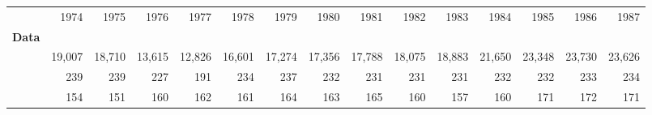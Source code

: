 \begin{tabular}{lllllllllllllll}
\cline{1-15}
\multicolumn{1}{c}{} &
  \multicolumn{1}{|r}{1974} &
  \multicolumn{1}{r}{1975} &
  \multicolumn{1}{r}{1976} &
  \multicolumn{1}{r}{1977} &
  \multicolumn{1}{r}{1978} &
  \multicolumn{1}{r}{1979} &
  \multicolumn{1}{r}{1980} &
  \multicolumn{1}{r}{1981} &
  \multicolumn{1}{r}{1982} &
  \multicolumn{1}{r}{1983} &
  \multicolumn{1}{r}{1984} &
  \multicolumn{1}{r}{1985} &
  \multicolumn{1}{r}{1986} &
  \multicolumn{1}{r}{1987} \\
\cline{1-15}
\multicolumn{1}{l}{\textbf{Data}} &
  \multicolumn{1}{|r}{} &
  \multicolumn{1}{r}{} &
  \multicolumn{1}{r}{} &
  \multicolumn{1}{r}{} &
  \multicolumn{1}{r}{} &
  \multicolumn{1}{r}{} &
  \multicolumn{1}{r}{} &
  \multicolumn{1}{r}{} &
  \multicolumn{1}{r}{} &
  \multicolumn{1}{r}{} &
  \multicolumn{1}{r}{} &
  \multicolumn{1}{r}{} &
  \multicolumn{1}{r}{} &
  \multicolumn{1}{r}{} \\
\multicolumn{1}{l}{\hspace{1em}{$\#$ obs.}} &
  \multicolumn{1}{|r}{19,007} &
  \multicolumn{1}{r}{18,710} &
  \multicolumn{1}{r}{13,615} &
  \multicolumn{1}{r}{12,826} &
  \multicolumn{1}{r}{16,601} &
  \multicolumn{1}{r}{17,274} &
  \multicolumn{1}{r}{17,356} &
  \multicolumn{1}{r}{17,788} &
  \multicolumn{1}{r}{18,075} &
  \multicolumn{1}{r}{18,883} &
  \multicolumn{1}{r}{21,650} &
  \multicolumn{1}{r}{23,348} &
  \multicolumn{1}{r}{23,730} &
  \multicolumn{1}{r}{23,626} \\
\multicolumn{1}{l}{\hspace{1em}{$\#$ sectors}} &
  \multicolumn{1}{|r}{239} &
  \multicolumn{1}{r}{239} &
  \multicolumn{1}{r}{227} &
  \multicolumn{1}{r}{191} &
  \multicolumn{1}{r}{234} &
  \multicolumn{1}{r}{237} &
  \multicolumn{1}{r}{232} &
  \multicolumn{1}{r}{231} &
  \multicolumn{1}{r}{231} &
  \multicolumn{1}{r}{231} &
  \multicolumn{1}{r}{232} &
  \multicolumn{1}{r}{232} &
  \multicolumn{1}{r}{233} &
  \multicolumn{1}{r}{234} \\
\multicolumn{1}{l}{\hspace{1em}{$\#$ origin countries}} &
  \multicolumn{1}{|r}{154} &
  \multicolumn{1}{r}{151} &
  \multicolumn{1}{r}{160} &
  \multicolumn{1}{r}{162} &
  \multicolumn{1}{r}{161} &
  \multicolumn{1}{r}{164} &
  \multicolumn{1}{r}{163} &
  \multicolumn{1}{r}{165} &
  \multicolumn{1}{r}{160} &
  \multicolumn{1}{r}{157} &
  \multicolumn{1}{r}{160} &
  \multicolumn{1}{r}{171} &
  \multicolumn{1}{r}{172} &
  \multicolumn{1}{r}{171} \\

\end{tabular}
